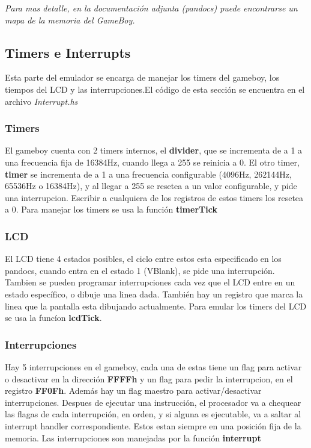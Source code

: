 \documentclass[a4paper,10pt]{report}
\begin{document}
\textit{Para mas detalle, en la documentación adjunta (pandocs) puede encontrarse un mapa de la memoria del GameBoy.}
\clearpage
\subsection*{Timers e Interrupts}
Esta parte del emulador se encarga de manejar los timers del gameboy, los tiempos del LCD y las interrupciones.El código de esta sección se encuentra en el archivo \textit{Interrupt.hs}
\subsubsection*{Timers}
El gameboy cuenta con 2 timers internos, el \textbf{divider}, que se incrementa de a 1 a una frecuencia fija de 16384Hz, cuando llega a 255 se reinicia a 0. El otro timer, \textbf{timer} se incrementa de a 1 a una frecuencia configurable (4096Hz, 262144Hz, 65536Hz o 16384Hz), y al llegar a 255 se resetea a un valor configurable, y pide una interrupcion. Escribir a cualquiera de los registros de estos timers los resetea a 0.
Para manejar los timers se usa la función \textbf{timerTick}
\subsubsection*{LCD}
El LCD tiene 4 estados posibles, el ciclo entre estos esta especificado en los pandocs, cuando entra en el estado 1 (VBlank), se pide una interrupción. Tambien se pueden programar interrupciones cada vez que el LCD entre en un estado específico, o dibuje una linea dada. También hay un registro que marca la linea que la pantalla esta dibujando actualmente. Para emular los timers del LCD se usa la funcíon \textbf{lcdTick}.
\subsubsection*{Interrupciones}
Hay 5 interrupciones en el gameboy, cada una de estas tiene un flag para activar o desactivar en la dirección \textbf{FFFFh} y un flag para pedir la interrupcion, en el registro \textbf{FF0Fh}. Además hay un flag maestro para activar/desactivar interrupciones. Despues de ejecutar una instrucción, el procesador va a chequear las flagas de cada interrupción, en orden, y si alguna es ejecutable, va a saltar al interrupt handler correspondiente. Estos estan siempre en una posición fija de la memoria. Las interrupciones son manejadas por la función \textbf{interrupt}\\
\end{document}
